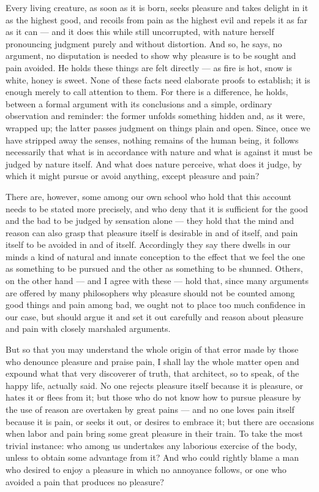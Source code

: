  Every living creature, as soon as it is born, seeks pleasure and takes delight in it as the highest good, and recoils from pain as the highest evil and repels it as far as it can — and it does this while still uncorrupted, with nature herself pronouncing judgment purely and without distortion. And so, he says, no argument, no disputation is needed to show why pleasure is to be sought and pain avoided. He holds these things are felt directly — as fire is hot, snow is white, honey is sweet. None of these facts need elaborate proofs to establish; it is enough merely to call attention to them. For there is a difference, he holds, between a formal argument with its conclusions and a simple, ordinary observation and reminder: the former unfolds something hidden and, as it were, wrapped up; the latter passes judgment on things plain and open. Since, once we have stripped away the senses, nothing remains of the human being, it follows necessarily that what is in accordance with nature and what is against it must be judged by nature itself. And what does nature perceive, what does it judge, by which it might pursue or avoid anything, except pleasure and pain?

 There are, however, some among our own school who hold that this account needs to be stated more precisely, and who deny that it is sufficient for the good and the bad to be judged by sensation alone — they hold that the mind and reason can also grasp that pleasure itself is desirable in and of itself, and pain itself to be avoided in and of itself. Accordingly they say there dwells in our minds a kind of natural and innate conception to the effect that we feel the one as something to be pursued and the other as something to be shunned. Others, on the other hand — and I agree with these — hold that, since many arguments are offered by many philosophers why pleasure should not be counted among good things and pain among bad, we ought not to place too much confidence in our case, but should argue it and set it out carefully and reason about pleasure and pain with closely marshaled arguments.

 But so that you may understand the whole origin of that error made by those who denounce pleasure and praise pain, I shall lay the whole matter open and expound what that very discoverer of truth, that architect, so to speak, of the happy life, actually said. No one rejects pleasure itself because it is pleasure, or hates it or flees from it; but those who do not know how to pursue pleasure by the use of reason are overtaken by great pains — and no one loves pain itself because it is pain, or seeks it out, or desires to embrace it; but there are occasions when labor and pain bring some great pleasure in their train. To take the most trivial instance: who among us undertakes any laborious exercise of the body, unless to obtain some advantage from it? And who could rightly blame a man who desired to enjoy a pleasure in which no annoyance follows, or one who avoided a pain that produces no pleasure?

